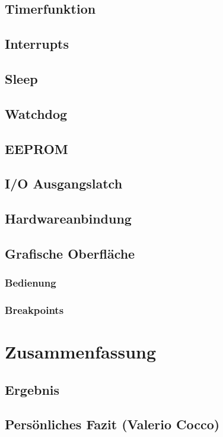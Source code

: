 \subsection{Timerfunktion}


\subsection{Interrupts}


\subsection{Sleep}


\subsection{Watchdog}


\subsection{EEPROM}


\subsection{I/O Ausgangslatch}


\subsection{Hardwareanbindung}



\subsection{Grafische Oberfläche}

\subsubsection{Bedienung}

\subsubsection{Breakpoints}



\section{Zusammenfassung}

\subsection{Ergebnis}


\subsection{Persönliches Fazit (Valerio Cocco)}

